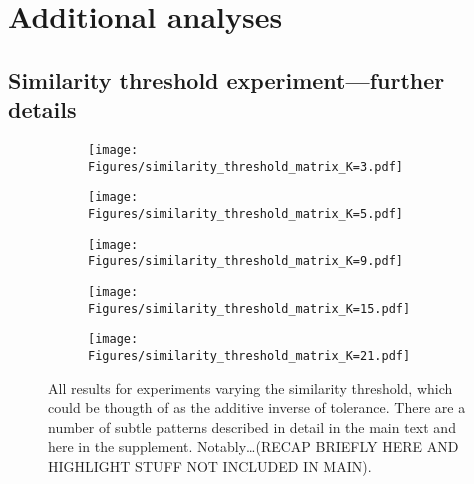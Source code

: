 \documentclass[11pt,letterpaper]{article}
\begin{document}
% 


% 

\appendix

\section{Additional analyses}

\subsection{Similarity threshold experiment---further details}

\begin{figure}[H]
    \centering
  \label{fig:}
  \centering
  \begin{subfigure}{\textwidth}
    \centering
      \texttt{[image: Figures/similarity\_threshold\_matrix\_K=3.pdf]}
      \caption{}
  \end{subfigure}
  \begin{subfigure}{\textwidth}
    \centering
      \texttt{[image: Figures/similarity\_threshold\_matrix\_K=5.pdf]}
      \caption{}
  \end{subfigure}
  \caption{}
\end{figure}
\begin{figure}[H]
  \ContinuedFloat
    \centering
  \begin{subfigure}{\textwidth}
    \centering
      \texttt{[image: Figures/similarity\_threshold\_matrix\_K=9.pdf]}
      \caption{}
  \end{subfigure}
  \begin{subfigure}{\textwidth}
    \centering
      \texttt{[image: Figures/similarity\_threshold\_matrix\_K=15.pdf]}
      \caption{}
  \end{subfigure}
  \caption{}
\end{figure}
\begin{figure}[H]
    \ContinuedFloat
    \centering
  \begin{subfigure}{\textwidth}
    \centering
      \texttt{[image: Figures/similarity\_threshold\_matrix\_K=21.pdf]}
      \caption{}
  \end{subfigure}
  \label{fig:similarity_supp}
  \caption{All results for experiments varying the similarity threshold, which
      could be thougth of as the additive inverse of tolerance. There are a
      number of subtle patterns described in detail in the main text and here
      in the supplement. Notably\dots (RECAP BRIEFLY HERE AND HIGHLIGHT 
      STUFF NOT INCLUDED IN MAIN).
}
\end{figure}
\end{document}
